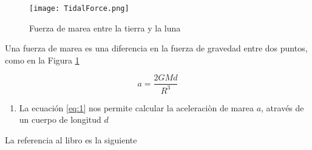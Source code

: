 \documentclass[a4paper]{article}
\newcounter{problema}
\begin{document}
\begin{problema}
    
    \begin{figure}[H]
        \centering
        \texttt{[image: TidalForce.png]}
        \caption{Fuerza de marea entre la tierra y la luna}
        \label{fig:1}
    \end{figure}

    Una fuerza de marea es una diferencia en la fuerza de gravedad entre dos puntos, como en la Figura \ref{fig:1}

    
    \begin{equation}
    a = \frac{2GMd}{R^3}
    \label{eq:1}
    \end{equation}

    \begin{enumerate}
        \item La ecuación \ref{eq:1} nos permite calcular la aceleraciòn de marea $a$, através de un
        cuerpo de longitud $d$
    \end{enumerate}
    
    La referencia al libro es la siguiente \cite{algebra2}
\end{problema}


\end{document}
